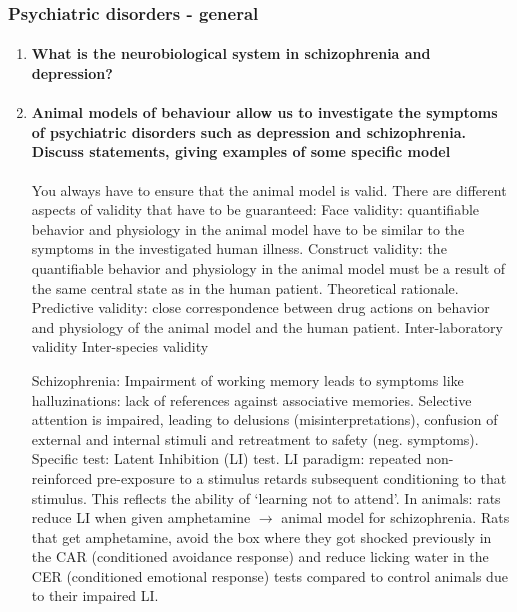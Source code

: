 \documentclass[12pt,article,oneside,a4paper]{memoir}
\begin{document}
\subsubsection{Psychiatric disorders - general}
\begin{enumerate}
\item \paragraph{What is the neurobiological system in schizophrenia and depression?}
\item \paragraph{Animal models of behaviour allow us to investigate the symptoms of psychiatric disorders such as depression and schizophrenia. Discuss statements, giving examples of some specific model}

You always have to ensure that the animal model is valid. There are different aspects of validity that have to be guaranteed:
Face validity: quantifiable behavior and physiology in the animal model have to be similar to the symptoms in the investigated human illness.
Construct validity: the quantifiable behavior and physiology in the animal model must be a result of the same central state as in the human patient. Theoretical rationale.
Predictive validity: close correspondence between drug actions on behavior and physiology of the animal model and the human patient.
Inter-laboratory validity
Inter-species validity

 Schizophrenia:
Impairment of working memory leads to symptoms like halluzinations: lack of references against associative memories.
	Selective attention is impaired, leading to delusions (misinterpretations), confusion of external and internal stimuli and retreatment to safety (neg. symptoms). 
Specific test: Latent Inhibition (LI) test. LI paradigm: repeated non-reinforced pre-exposure to a stimulus retards subsequent conditioning to that stimulus. This reflects the ability of ‘learning not to attend’. In animals: rats reduce LI when given amphetamine $\rightarrow$ animal model for schizophrenia. Rats that get amphetamine, avoid the box where they got shocked previously in the CAR (conditioned avoidance response) and reduce licking water in the CER (conditioned emotional response) tests compared to control animals due to their impaired LI.



\end{enumerate}
\end{document}
